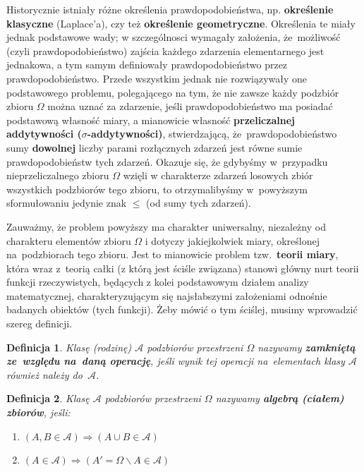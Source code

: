 \documentclass[10pt,a4paper]{article}
\newtheorem{definition}{Definicja}[section]
\numberwithin{equation}{subsection}
\begin{document}
Historycznie istniały różne określenia prawdopodobieństwa, np. \textbf{określenie
  klasyczne} (Laplace'a), czy też \textbf{określenie geometryczne}. Określenia
te miały jednak podstawowe wady; w szczególnosci wymagały założenia, że~możliwość
(czyli prawdopodobieństwo) zajścia każdego zdarzenia elementarnego jest jednakowa,
a tym samym definiowały prawdopodobieństwo przez prawdopodobieństwo. Przede
wszystkim jednak nie rozwiązywały one podstawowego problemu, polegającego na tym,
że nie zawsze każdy podzbiór zbioru $\Omega$ można uznać za zdarzenie, jeśli
prawdopodobieństwo ma posiadać podstawową własność miary, a mianowicie własność
\textbf{przeliczalnej addytywności ($\sigma$-addytywności)}, stwierdzającą,
że~prawdopodobieństwo sumy \textbf{dowolnej} liczby parami rozłącznych zdarzeń
jest równe sumie prawdopodobieństw tych zdarzeń. Okazuje się, że gdybyśmy
w~przypadku nieprzeliczalnego zbioru $\Omega$ wzięli w charakterze zdarzeń
losowych zbiór wszystkich podzbiorów tego zbioru, to otrzymalibyśmy w~powyższym
sformułowaniu jedynie znak $\leq$ (od sumy tych zdarzeń).

Zauważmy, że problem powyższy ma charakter uniwersalny, niezależny od charakteru
elementów zbioru $\Omega$ i dotyczy jakiejkolwiek miary, określonej
na~podzbiorach tego zbioru. Jest to mianowicie problem tzw.~\textbf{teorii miary},
która wraz z~teorią całki (z którą jest ściśle związana) stanowi główny nurt
teorii funkcji rzeczywistych, będących z kolei podstawowym działem analizy
matematycznej, charakteryzującym się najsłabszymi założeniami odnośnie badanych
obiektów (tych funkcji). Żeby mówić o tym ściślej, musimy wprowadzić szereg
definicji.

\begin{definition}
  Klasę (rodzinę) $\mathscr{A}$ podzbiorów przestrzeni $\Omega$ nazywamy
  \textbf{zamkniętą ze~względu na~daną operację}, jeśli wynik tej operacji
  na~elementach klasy $\mathscr{A}$ również należy do~$\mathscr{A}$.
\end{definition}

\begin{definition}
  Klasę $\mathscr{A}$ podzbiorów przestrzeni $\Omega$ nazywamy \textbf{algebrą
    (ciałem) zbiorów}, jeśli:
  \begin{enumerate}
  \item[1$^\circ$] $(A, B \in\mathscr{A}) \Longrightarrow (A\cup B \in \mathscr{A})$
  \item[2$^\circ$] $(A\in\mathscr{A})\Longrightarrow (A'=\Omega \backslash A
    \in \mathscr{A})$
  \end{enumerate}
\end{definition}
\end{document}
